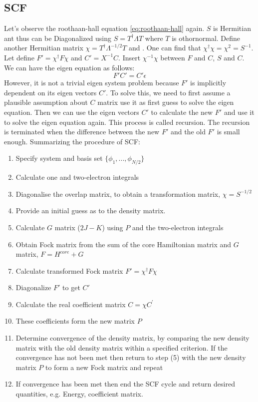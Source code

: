 \documentclass[11pt]{article}
\begin{document}
\subsection{SCF}\label{s:scf-procedure}
Let's observe the roothaan-hall equation \ref{eq:roothaan-hall} again. $S$ is Hermitian ant thus can be Diagonalized using $S=T^{\dag} \Lambda T$ where $T$ is othornormal. Define another Hermitian matrix $ \chi = T^{\dag}\Lambda^{-1/2} T$ and . One can find that $\chi^{\dag}\chi = \chi^2 = S^{-1}$. Let define $F' = \chi^{\dag} F \chi$ and $C'=X^{-1}C$. Insert $\chi^{-1}\chi$ between $F$ and $C$, $S$ and $C$. We can have the eigen equation as follows:
\begin{equation}
    F' C' = C' \epsilon
\end{equation} 
However, it is not a trivial eigen system problem because $F'$ is implicitly dependent on its eigen vectors $C'$. To solve this, we need to first assume a plausible assumption about $C$ matrix use it as first guess to solve the eigen equation. Then we can use the eigen vectors $C'$ to calculate the new $F'$ and use it to solve the eigen equation again. This process is called recursion. The recursion is terminated when the difference between the new $F'$ and the old $F'$ is small enough. Summarizing the procedure of SCF:
\begin{enumerate}
    \item Specify system and basis set $\{\phi_1, ...,\phi_{N/2}\}$
    \item Calculate one and two-electron integrals
    \item Diagonalise the overlap matrix, to obtain a transformation matrix, $\chi = S^{-1/2}$
    \item Provide an initial guess as to the density matrix. 
    \item Calculate $G$ matrix ($2J-K$)  using $P$ and the two-electron integrals
    \item Obtain Fock matrix from the sum of the core Hamiltonian matrix and  $G$ matrix, $F=H^{core} + G$
    \item Calculate transformed Fock matrix $F'=\chi^{\dag} F \chi$
    \item Diagonalize $F'$ to get $C'$
    \item Calculate the real coefficient matrix $C=\chi C^{'}$
    \item These coefficients form the new matrix $P$
    \item Determine convergence of the density matrix, by comparing the new density matrix with the old density matrix within a specified criterion. If the convergence has not been met then return to step (5) with the new density matrix $P$ to form a new Fock matrix and repeat
    \item If convergence has been met then end the SCF cycle and return desired quantities, e.g. Energy, coefficient matrix.
\end{enumerate}
\end{document}
